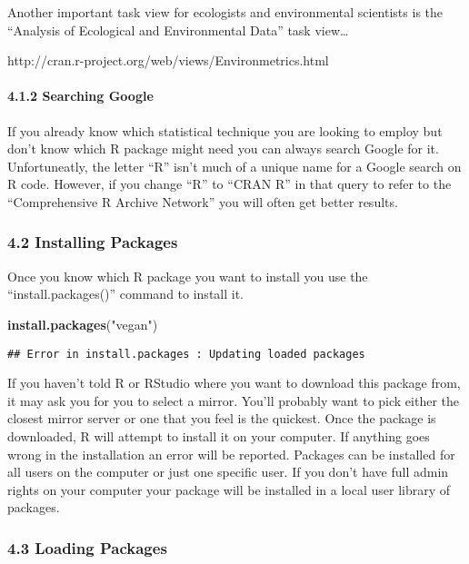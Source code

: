 \documentclass[]{article}
\newenvironment{Shaded}{}{}
\newcommand{\KeywordTok}[1]{\textcolor[rgb]{0.00,0.44,0.13}{\textbf{{#1}}}}
\newcommand{\StringTok}[1]{\textcolor[rgb]{0.25,0.44,0.63}{{#1}}}
\newcommand{\NormalTok}[1]{{#1}}
\begin{document}
Another important task view for ecologists and environmental scientists
is the ``Analysis of Ecological and Environmental Data'' task
view\ldots{}

http://cran.r-project.org/web/views/Environmetrics.html

\paragraph{4.1.2 Searching Google}

If you already know which statistical technique you are looking to
employ but don't know which R package might need you can always search
Google for it. Unfortuneatly, the letter ``R'' isn't much of a unique
name for a Google search on R code. However, if you change ``R'' to
``CRAN R'' in that query to refer to the ``Comprehensive R Archive
Network'' you will often get better results.

\subsubsection{4.2 Installing Packages}

Once you know which R package you want to install you use the
``install.packages()'' command to install it.

\begin{Shaded}
\begin{Highlighting}[]
\KeywordTok{install.packages}\NormalTok{(}\StringTok{"vegan"}\NormalTok{)}
\end{Highlighting}
\end{Shaded}

\begin{verbatim}
## Error in install.packages : Updating loaded packages
\end{verbatim}

If you haven't told R or RStudio where you want to download this package
from, it may ask you for you to select a mirror. You'll probably want to
pick either the closest mirror server or one that you feel is the
quickest. Once the package is downloaded, R will attempt to install it
on your computer. If anything goes wrong in the installation an error
will be reported. Packages can be installed for all users on the
computer or just one specific user. If you don't have full admin rights
on your computer your package will be installed in a local user library
of packages.

\subsubsection{4.3 Loading Packages}
\end{document}
